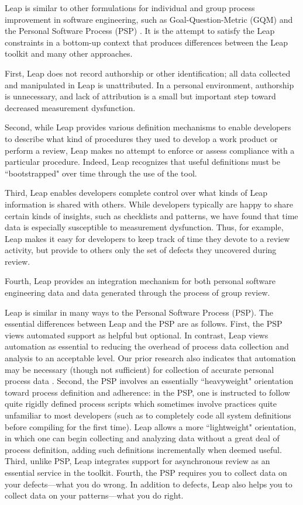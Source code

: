 Leap is similar to other formulations for individual and group process
improvement in software engineering, such as Goal-Question-Metric (GQM)
\cite{Basili84} and the Personal Software Process (PSP) \cite{Humphrey95}.
It is the attempt to satisfy the Leap constraints in a bottom-up context
that produces differences between the Leap toolkit and many other
approaches.

First, Leap does not record authorship or other identification; all data
collected and manipulated in Leap is unattributed.  In a personal
environment, authorship is unnecessary, and lack of attribution is a small
but important step toward decreased measurement dysfunction.

Second, while Leap provides various definition mechanisms to enable
developers to describe what kind of procedures they used to develop a work
product or perform a review, Leap makes no attempt to enforce or assess
compliance with a particular procedure. Indeed, Leap recognizes that useful
definitions must be ``bootstrapped" over time through the use of the tool.

Third, Leap enables developers complete control over what kinds of Leap
information is shared with others. While developers typically are happy to
share certain kinds of insights, such as checklists and patterns, we have
found that time data is especially susceptible to measurement dysfunction.
Thus, for example, Leap makes it easy for developers to keep track of time
they devote to a review activity, but provide to others only the set of
defects they uncovered during review.

Fourth, Leap provides an integration mechanism for both personal software
engineering data and data generated through the process of group review.

Leap is similar in many ways to the Personal Software Process (PSP).  The
essential differences between Leap and the PSP are as follows.  First, the
PSP views automated support as helpful but optional.  In contrast, Leap
views automation as essential to reducing the overhead of process data
collection and analysis to an acceptable level. Our prior research also
indicates that automation may be necessary (though not sufficient) for
collection of accurate personal process data \cite{Disney98}.  Second, the
PSP involves an essentially ``heavyweight" orientation toward process
definition and adherence: in the PSP, one is instructed to follow quite
rigidly defined process scripts which sometimes involve practices quite
unfamiliar to most developers (such as to completely code all system
definitions before compiling for the first time).  Leap allows a more
``lightweight" orientation, in which one can begin collecting and analyzing
data without a great deal of process definition, adding such definitions
incrementally when deemed useful.  Third, unlike PSP, Leap integrates
support for asynchronous review as an essential service in the toolkit.
Fourth, the PSP requires you to collect data on your defects---what you do
wrong. In addition to defects, Leap also helps you to collect data on your
patterns---what you do right.

